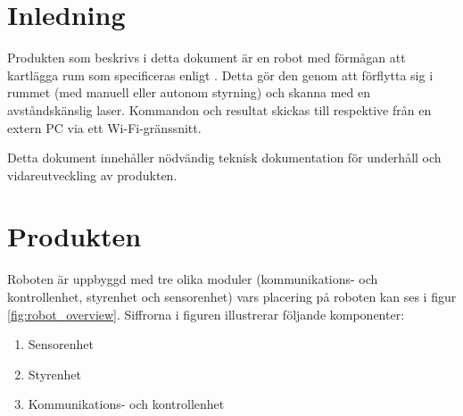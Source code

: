 \documentclass[a4paper,11pt]{article}
\begin{document}
\pagestyle{intro}
\LIPStitelsida
\clearpage
\begin{LIPSprojektidentitet}
\end{LIPSprojektidentitet}

\clearpage
\renewcommand{\familydefault}{\sfdefault}	%
\normalfont
\tableofcontents
\renewcommand{\familydefault}{\rmdefault}	%
\normalfont
\clearpage
\begin{LIPSdokumenthistorik}
    \LIPSversionsinfo{}{}{}{}{}
\end{LIPSdokumenthistorik}
\clearpage
\setcounter{page}{1}
\pagestyle{content}

\section{Inledning}
Produkten som beskrivs i detta dokument är en robot med förmågan att kartlägga rum som specificeras enligt \cite{coursespec}. Detta gör den genom att förflytta sig i rummet (med manuell eller autonom styrning) och skanna med en avståndskänslig laser. Kommandon och resultat skickas till respektive från en extern PC via ett Wi-Fi-gränssnitt.

Detta dokument innehåller nödvändig teknisk dokumentation för underhåll och vidareutveckling av produkten.

\clearpage
\section{Produkten}
Roboten är uppbyggd med tre olika moduler (kommunikations- och kontrollenhet, styrenhet och sensorenhet) vars placering på roboten kan ses i figur \ref{fig:robot_overview}. Siffrorna i figuren illustrerar följande komponenter:
\begin{enumerate}
\item Sensorenhet
\item Styrenhet
\item Kommunikations- och kontrollenhet
\end{enumerate}
\end{document}

